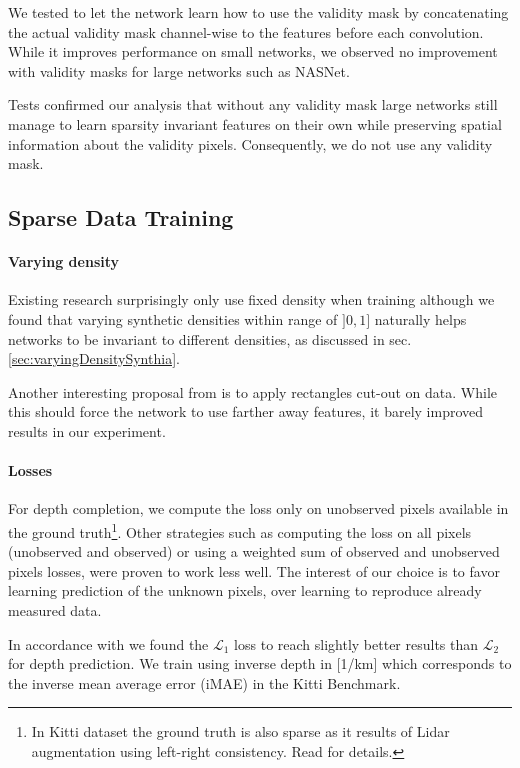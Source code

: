 \documentclass[10pt,twocolumn,letterpaper]{article}
\begin{document}
We tested to let the network learn how to use the validity mask by concatenating the actual validity mask channel-wise to the features before each convolution.
While it improves performance on small networks, we observed no improvement with validity masks for large networks such as NASNet.

Tests confirmed our analysis that without any validity mask large networks still manage to learn sparsity invariant features on their own while preserving spatial
information about the validity pixels. 
Consequently, we do not use any validity mask.


\subsection{Sparse Data Training}
\label{sec:sparse-training}

\paragraph{Varying density}

Existing research surprisingly only use fixed density when training although we found that varying synthetic densities within range of $]0, 1]$ naturally helps networks to be invariant to different densities, as discussed in sec. \ref{sec:varyingDensitySynthia}.

Another interesting proposal from \cite{devries2017improved} is to apply rectangles cut-out on data. While this should force the network to use farther away features, it barely improved results in our experiment.


\paragraph{Losses}
For depth completion, we compute the loss only on unobserved pixels available in the ground truth\footnote{In Kitti dataset the ground truth is also sparse as it results of Lidar augmentation using left-right consistency. Read \cite{uhrig2017sparsity} for details.}.
Other strategies such as computing the loss on all pixels (unobserved and observed) or using a weighted sum of observed and unobserved pixels losses, were proven to work less well.
The interest of our choice is to favor learning prediction of the unknown pixels, over learning to reproduce already measured data.

In accordance with \cite{uhrig2017sparsity} we found the $\mathcal{L}_1$ loss to reach slightly better results than $\mathcal{L}_2$ for depth prediction.
We train using inverse depth in [1/km] which corresponds to the inverse mean average error (iMAE) in the Kitti Benchmark.
\end{document}
